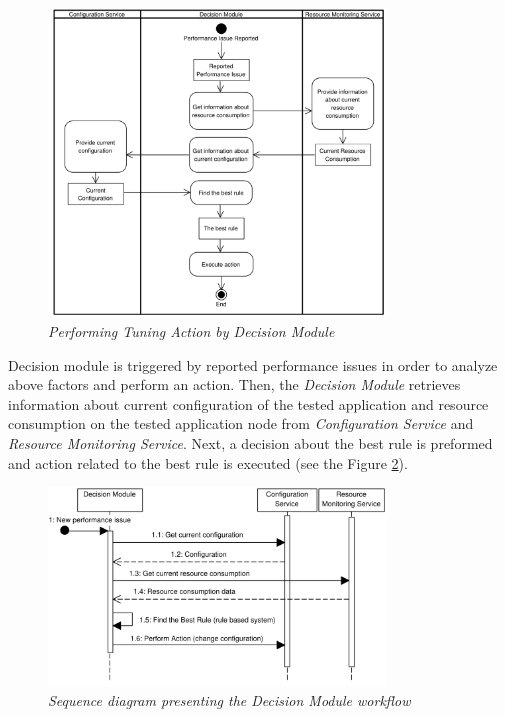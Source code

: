 \documentclass[12pt,a4paper]{article}
\begin{document}
\begin{figure}[!htb]
\centering
\includegraphics[width=0.8\textwidth]{APTSFlow}
\caption{\textit{Performing Tuning Action by Decision Module}} \label{decisionmodule}
\end{figure}

Decision module is triggered by reported performance issues in order to analyze above factors and perform an action. Then, the \textit{Decision Module} retrieves information about current configuration of the tested application and resource consumption on the tested application node from \textit{Configuration Service} and \textit{Resource Monitoring Service}. Next, a decision about the best rule is preformed and action related to the best rule is executed (see the Figure \ref{dmsequence}). 

\begin{figure}[!htb]
\centering
\includegraphics[width=0.8\textwidth]{DecisionModuleSequenceDiagram}
\caption{\textit{Sequence diagram presenting the Decision Module workflow}} \label{dmsequence}
\end{figure}
\end{document}
